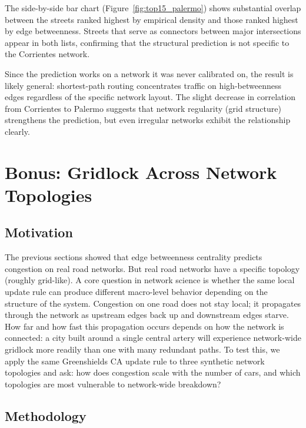 \documentclass[12pt]{article}
\begin{document}
The side-by-side bar chart (Figure~\ref{fig:top15_palermo}) shows substantial overlap between the streets ranked highest by empirical density and those ranked highest by edge betweenness. Streets that serve as connectors between major intersections appear in both lists, confirming that the structural prediction is not specific to the Corrientes network.

Since the prediction works on a network it was never calibrated on, the result is likely general: shortest-path routing concentrates traffic on high-betweenness edges regardless of the specific network layout. The slight decrease in correlation from Corrientes to Palermo suggests that network regularity (grid structure) strengthens the prediction, but even irregular networks exhibit the relationship clearly.


\section{Bonus: Gridlock Across Network Topologies}
\label{sec:gridlock}

\subsection{Motivation}

The previous sections showed that edge betweenness centrality predicts congestion on real road networks. But real road networks have a specific topology (roughly grid-like). A core question in network science is whether the same local update rule can produce different macro-level behavior depending on the structure of the system. Congestion on one road does not stay local; it propagates through the network as upstream edges back up and downstream edges starve. How far and how fast this propagation occurs depends on how the network is connected: a city built around a single central artery will experience network-wide gridlock more readily than one with many redundant paths. To test this, we apply the same Greenshields CA update rule to three synthetic network topologies and ask: how does congestion scale with the number of cars, and which topologies are most vulnerable to network-wide breakdown?

\subsection{Methodology}
\end{document}
